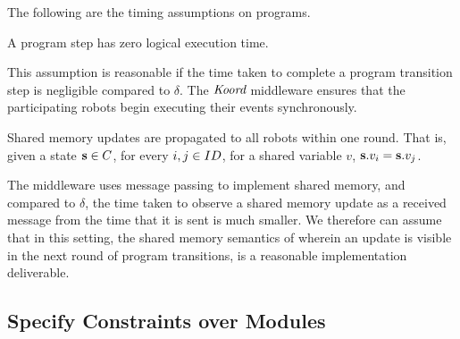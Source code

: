 
The following are the timing assumptions on \lgname programs.
\begin{assumption} A program step has zero logical execution time.
\end{assumption}
This assumption is reasonable if the time taken to complete a program transition step is negligible compared to $\delta$.  The $\emph{Koord}$ middleware ensures that the participating robots begin executing their events synchronously.

\begin{assumption}
    \label{shared}
    Shared memory updates are propagated to all robots within one round. That is, given a state ${\textbf{s}}\in C$, for every  $i,j \in ID$, for a shared variable $v$, ${\textbf{s}}.v_i = {\textbf{s}}.v_j$.
\end{assumption}
The \lgname middleware uses message passing to implement shared memory, and compared to $\delta$, the time taken to observe a shared memory update as a received message from the time that it is sent is much smaller. We therefore can assume that in this setting, the shared memory semantics of \lgname wherein an update is visible in the next round of program transitions, is a reasonable implementation deliverable.



\subsection{Specify Constraints over Modules}
\label{sec:module}
